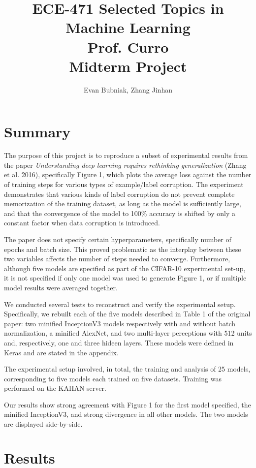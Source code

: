 \documentclass[12pt]{article}
\title{%
	ECE-471 Selected Topics in Machine Learning \\
	Prof. Curro \\
	Midterm Project}
\author{Evan Bubniak, Zhang Jinhan}
\begin{document}
\maketitle

\section{Summary}

The purpose of this project is to reproduce a subset of experimental results from the paper \textit{Understanding deep learning requires rethinking generalization} (Zhang et al. 2016), specifically Figure 1, which plots the average loss against the number of training steps for various types of example/label corruption. The experiment demonstrates that various kinds of label corruption do not prevent complete memorization of the training dataset, as long as the model is sufficiently large, and that the convergence of the model to 100\% accuracy is shifted by only a constant factor when data corruption is introduced.

The paper does not specify certain hyperparameters, specifically number of epochs and batch size. This proved problematic as the interplay between these two variables affects the number of steps needed to converge. Furthermore, although five models are specified as part of the CIFAR-10 experimental set-up, it is not specified if only one model was used to generate Figure 1, or if multiple model results were averaged together.

We conducted several tests to reconstruct and verify the experimental setup. Specifically, we rebuilt each of the five models described in Table 1 of the original paper: two minified InceptionV3 models respectively with and without batch normalization, a minified AlexNet, and two multi-layer perceptions with 512 units and, respectively, one and three hideen layers. These models were defined in Keras and are stated in the appendix.

The experimental setup involved, in total, the training and analysis of 25 models, corresponding to five models each trained on five datasets. Training was performed on the KAHAN server.

Our results show strong agreement with Figure 1 for the first model specified, the minified InceptionV3, and strong divergence in all other models. The two models are displayed side-by-side. 

\section{Results}
\end{document}
